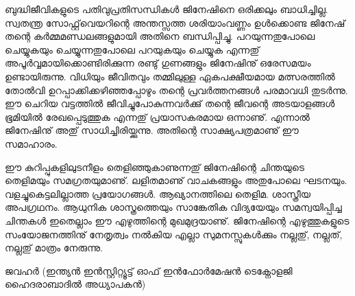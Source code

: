 ബുദ്ധിജീവികളുടെ പതിവുപ്രതിസന്ധികള്‍ ജിനേഷിനെ ഒരിക്കലും ബാധിച്ചില്ല. സ്വതന്ത്ര സോഫ്റ്റ്‌വെയറിന്റെ അന്തസ്സത്ത ശരിയാംവണ്ണം 
ഉള്‍ക്കൊണ്ട ജിനേഷ് തന്റെ കര്‍മ്മമണ്ഡലങ്ങളുമായി അതിനെ ബന്ധിപ്പിച്ചു. പറയുന്നതുപോലെ ചെയ്യുകയും ചെയ്യുന്നതുപോലെ പറയുകയും 
ചെയ്യുക എന്നതു് അപൂര്‍വ്വമായിക്കൊണ്ടിരിക്കുന്ന രണ്ടു് ഗുണങ്ങളും ജിനേഷിനു് ഒരേസമയം ഉണ്ടായിരുന്നു. വിധിയും ജീവിതവും തമ്മിലുള്ള 
ഏകപക്ഷീയമായ മത്സരത്തില്‍ തോല്‍വി ഉറപ്പാക്കിക്കഴിഞ്ഞപ്പോഴും തന്റെ പ്രവര്‍ത്തനങ്ങള്‍ പരമാവധി തുടര്‍ന്നു.  ഈ ചെറിയ വട്ടത്തില്‍ 
ജീവിച്ചുപോകുന്നവര്‍ക്കു് തന്റെ ജീവന്റെ അടയാളങ്ങള്‍ ഭൂമിയില്‍ രേഖപ്പെടുത്തുക എന്നതു് പ്രയാസകരമായ ഒന്നാണു്. എന്നാല്‍ ജിനേഷിനു് 
അതു് സാധിച്ചിരിയ്ക്കുന്നു. അതിന്റെ സാക്ഷ്യപത്രമാണു് ഈ സമാഹാരം.

ഈ കുറിപ്പുകളിലുടനീളം തെളിഞ്ഞുകാണുന്നതു് ജിനേഷിന്റെ ചിന്തയുടെ തെളിമയും സമഗ്രതയുമാണു്. ലളിതമാണു് വാചകങ്ങളും അതുപോലെ ഘടനയും. 
വളച്ചുകെട്ടലില്ലാത്ത പ്രയോഗങ്ങള്‍. ആഖ്യാനത്തിലെ തെളിമ. ശാസ്ത്രീയ അപഗ്രഥനം. ആധുനിക ശാസ്ത്രത്തെയും സാങ്കേതിക വിദ്യയേയും സമന്വയിപ്പിച്ച 
ചിന്തകള്‍ ഇതെല്ലാം ഈ എഴുത്തിന്റെ മുഖമുദ്രയാണു്. ജിനേഷിന്റെ എഴുത്തുകളുടെ സംയോജനത്തിനു് നേതൃത്വം നല്‍കിയ എല്ലാ സുമനസ്സുകള്‍ക്കും 
നല്ലതു്, നല്ലത്, നല്ലതു് മാത്രം നേരുന്നു. 

\hspace*{2em}ജവഹര്‍ (ഇന്ത്യന്‍ ഇന്‍സ്റ്റിറ്റ്യൂട്ട് ഓഫ് ഇന്‍ഫോര്‍മേഷന്‍ ടെക്നോളജി ഹൈദരാബാദില്‍ അധ്യാപകന്‍) 
\newpage
